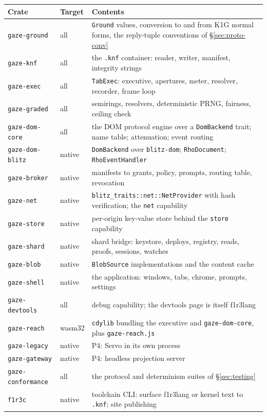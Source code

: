 \documentclass[11pt]{article}
\theoremstyle{definition}
\theoremstyle{remark}
\newcommand{\fl}{f1r3lang}
\newcommand{\code}[1]{\texttt{#1}}
\begin{document}
\begin{center}\small
\begin{tabularx}{\linewidth}{@{}p{3.3cm}p{1.5cm}X@{}}
\toprule
Crate & Target & Contents\\
\midrule
\code{gaze-ground} & all & \code{Ground} values, conversion to and from K1G normal forms, the reply-tuple conventions of \S\ref{sec:proto-conv}\\
\code{gaze-knf} & all & the \code{.knf} container: reader, writer, manifest, integrity strings\\
\code{gaze-exec} & all & \code{TabExec}: executive, apertures, meter, resolver, recorder, frame loop\\
\code{gaze-graded} & all & semirings, resolvers, deterministic PRNG, fairness, ceiling check\\
\code{gaze-dom-core} & all & the DOM protocol engine over a \code{DomBackend} trait; name table; attenuation; event routing\\
\code{gaze-dom-blitz} & native & \code{DomBackend} over \code{blitz-dom}; \code{RhoDocument}; \code{RhoEventHandler}\\
\code{gaze-broker} & native & manifests to grants, policy, prompts, routing table, revocation\\
\code{gaze-net} & native & \code{blitz\_traits::net::NetProvider} with hash verification; the \code{net} capability\\
\code{gaze-store} & native & per-origin key-value store behind the \code{store} capability\\
\code{gaze-shard} & native & shard bridge: keystore, deploys, registry, reads, proofs, sessions, watches\\
\code{gaze-blob} & native & \code{BlobSource} implementations and the content cache\\
\code{gaze-shell} & native & the application: windows, tabs, chrome, prompts, settings\\
\code{gaze-devtools} & all & debug capability; the devtools page is itself \fl{}\\
\code{gaze-reach} & wasm32 & \code{cdylib} bundling the executive and \code{gaze-dom-core}, plus \code{gaze-reach.js}\\
\code{gaze-legacy} & native & P4: Servo in its own process\\
\code{gaze-gateway} & native & P4: headless projection server\\
\code{gaze-conformance} & all & the protocol and determinism suites of \S\ref{sec:testing}\\
\code{f1r3c} & native & toolchain CLI: surface \fl{} or kernel text to \code{.knf}; site publishing\\
\bottomrule
\end{tabularx}
\end{center}
\end{document}
